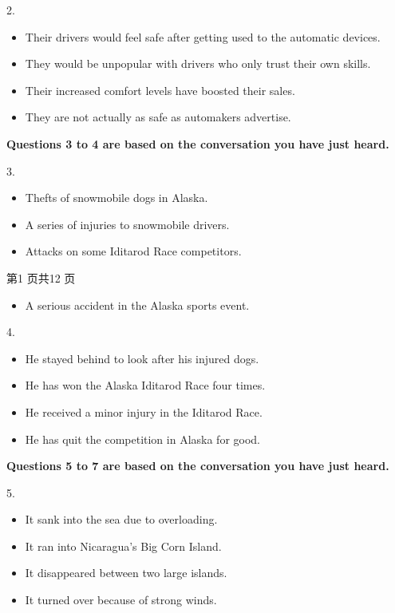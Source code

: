 \documentclass[UTF8,11pt]{ctexart}
\begin{document}
2.


\begin{itemize}[leftmargin=2em,itemsep=.2em,topsep=.4em]\item[A.] Their drivers would feel safe after getting used to the automatic devices.
\item[B.] They would be unpopular with drivers who only trust their own skills.
\item[C.] Their increased comfort levels have boosted their sales.
\item[D.] They are not actually as safe as automakers advertise.
\end{itemize}

\textbf{Questions 3 to 4 are based on the conversation you have just heard.}


3.


\begin{itemize}[leftmargin=2em,itemsep=.2em,topsep=.4em]\item[A.] Thefts of snowmobile dogs in Alaska.
\item[B.] A series of injuries to snowmobile drivers.
\item[C.] Attacks on some Iditarod Race competitors.
\end{itemize}

第1 页共12 页


\begin{itemize}[leftmargin=2em,itemsep=.2em,topsep=.4em]\item[D.] A serious accident in the Alaska sports event.
\end{itemize}

4.


\begin{itemize}[leftmargin=2em,itemsep=.2em,topsep=.4em]\item[A.] He stayed behind to look after his injured dogs.
\item[B.] He has won the Alaska Iditarod Race four times.
\item[C.] He received a minor injury in the Iditarod Race.
\item[D.] He has quit the competition in Alaska for good.
\end{itemize}

\textbf{Questions 5 to 7 are based on the conversation you have just heard.}


5.


\begin{itemize}[leftmargin=2em,itemsep=.2em,topsep=.4em]\item[A.] It sank into the sea due to overloading.
\item[B.] It ran into Nicaragua’s Big Corn Island.
\item[C.] It disappeared between two large islands.
\item[D.] It turned over because of strong winds.
\end{itemize}
\end{document}
